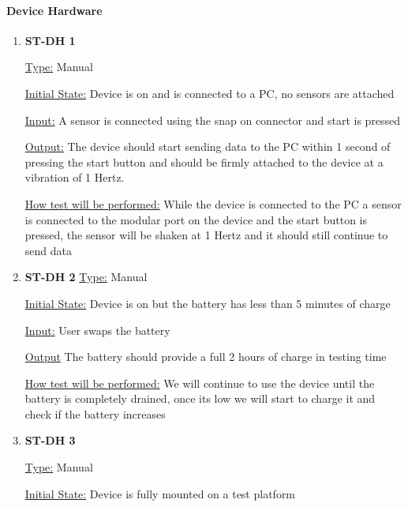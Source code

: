 \documentclass[12pt, titlepage]{article}
\begin{document}
  \paragraph{Device Hardware}	
  \begin{enumerate}
  
    \item{\bf{ST-DH 1}}
    
    \underline{Type:} Manual
              
    \underline{Initial State:} Device is on and is connected to a PC, no sensors are attached
              
    \underline{Input:} A sensor is connected using the snap on connector and start is pressed
              
    \underline{Output:} The device should start sending data to the PC within 1 second of pressing the start button and should be firmly attached to the device at a vibration of 1 Hertz.
              
    \underline{How test will be performed:} While the device is connected to the PC a sensor is connected to the modular port on the device and the start button is pressed, the sensor will be shaken at 1 Hertz and it should still continue to send data\\
  
    \item{\bf{ST-DH 2}}
    \underline{Type:} Manual
              
    \underline{Initial State:} Device is on but the battery has less than 5 minutes of charge
              
    \underline{Input:} User swaps the battery
              
    \underline{Output} The battery should provide a full 2 hours of charge in testing time
    
              
    \underline{How test will be performed:} We will continue to use the device until the battery is completely drained, once its low we will start to charge it and check if the battery increases\\

    \item{\bf{ST-DH 3}}
    
    \underline{Type:} Manual
              
    \underline{Initial State:} Device is fully mounted on a test platform
              

\end{enumerate}
\end{document}
